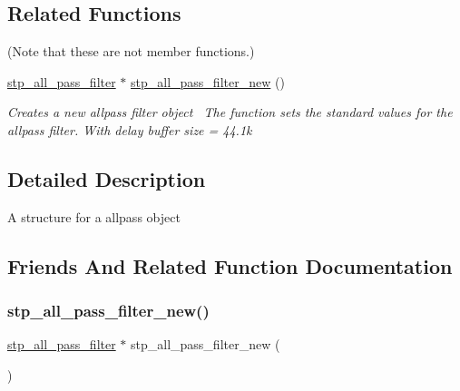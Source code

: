 \subsection*{Related Functions}
(Note that these are not member functions.) \begin{DoxyCompactItemize}
\item 
\hyperlink{structstp__all__pass__filter}{stp\+\_\+all\+\_\+pass\+\_\+filter} $\ast$ \hyperlink{structstp__all__pass__filter_a493ebb4f85e462564b6c5d9b16d827b0}{stp\+\_\+all\+\_\+pass\+\_\+filter\+\_\+new} ()
\begin{DoxyCompactList}\small\item\em Creates a new allpass filter object~\newline
 The function sets the standard values for the allpass filter. With delay buffer size = 44.\+1k ~\newline
 \end{DoxyCompactList}\end{DoxyCompactItemize}


\subsection{Detailed Description}
A structure for a allpass object ~\newline
 

\subsection{Friends And Related Function Documentation}
\mbox{\label{structstp__all__pass__filter_a493ebb4f85e462564b6c5d9b16d827b0}} 
\subsubsection{\texorpdfstring{stp\+\_\+all\+\_\+pass\+\_\+filter\+\_\+new()}{stp\_all\_pass\_filter\_new()}}
{\footnotesize\ttfamily \hyperlink{structstp__all__pass__filter}{stp\+\_\+all\+\_\+pass\+\_\+filter} $\ast$ stp\+\_\+all\+\_\+pass\+\_\+filter\+\_\+new (\begin{DoxyParamCaption}{ }\end{DoxyParamCaption})\hspace{0.3cm}{\ttfamily [related]}}



